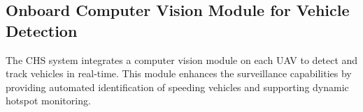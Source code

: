 



\subsection{Onboard Computer Vision Module for Vehicle Detection}

The CHS system integrates a computer vision module on each UAV to detect and track vehicles in real-time. This module enhances the surveillance capabilities by providing automated identification of speeding vehicles and supporting dynamic hotspot monitoring.

